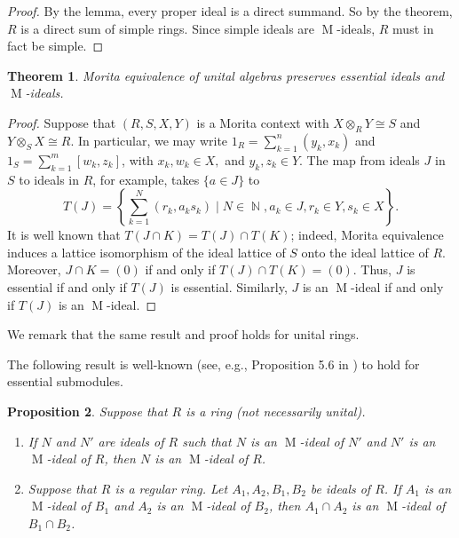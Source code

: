 \documentclass[11pt,leqno]{amsart}
\DeclareMathOperator{\m}{M}
\newtheorem{theorem}{Theorem}[section]
\newtheorem{proposition}[theorem]{Proposition}
\theoremstyle{definition}
\theoremstyle{remark}
\numberwithin{equation}{section}
\numberwithin{equation}{section}
\DeclareMathOperator{\bN}{{\mathds N}}
\begin{document}
\begin{proof}  By the lemma, every proper ideal is a direct summand.
So by the theorem, $R$ is a direct sum of simple rings. Since simple ideals are $\m$-ideals, $R$ must in fact be simple. 
\end{proof}

\begin{theorem}\label{morita}
Morita equivalence of unital algebras preserves essential ideals and  $\m$-ideals.
\end{theorem}

\begin{proof}  Suppose that $(R,S,X,Y)$ is a Morita context with $X \otimes_R Y \cong S$ and $Y \otimes_S X \cong R$. 
In particular, we may write $1_R = \sum_{k=1}^n (y_k,x_k)$ and $1_S = \sum_{k=1}^m [w_k,z_k]$, with  $x_k, w_k \in X,$ and $y_k, z_k \in Y$.  The map from ideals $J$ in $S$ to ideals in $R$, for example,
takes $\{ a \in J \}$ to \[T(J) = \left\{ \sum_{k=1}^N (r_k,
a_k  s_k) \mid  N \in \bN, 
a_k \in J, r_k \in Y, s_k \in X \right\}.\] 
It is well known that $T(J \cap K) = T(J) \cap T(K)$; indeed, Morita equivalence induces a lattice isomorphism of the ideal lattice of $S$ onto the ideal lattice of $R$.  
Moreover,  
$J \cap K = (0)$ if and only if $T(J) \cap T(K) = (0)$. 
Thus, $J$ is essential if and only if $T(J)$ is essential.   Similarly, $J$ is an $\m$-ideal if and only if $T(J)$ is an $\m$-ideal.
\end{proof}

We remark that the same result and proof holds for unital rings.

The following result is well-known (see, e.g., Proposition 5.6 in \cite{GW04}) to hold for essential submodules. 

\begin{proposition}\label{krs}
Suppose that $R$ is a ring (not necessarily unital).
\begin{enumerate}
\item If $N$ and $N'$ are ideals of $R$ such that  $N$ is an $\m$-ideal of $N'$ and $N'$ is an $\m$-ideal of $R$, then $N$ is an $\m$-ideal of $R$.
 
\item Suppose that $R$ is a regular ring. Let \( A_1, A_2, B_1, B_2 \) be ideals of  \( R \). If \( A_1\) is an $\m$-ideal of \(B_1 \) and \( A_2\) is an $\m$-ideal of \(B_2 \), then \(A_1 \cap A_2\) is an $\m$-ideal of \(B_1 \cap B_2\).
\end{enumerate}
\end{proposition}
\end{document}
